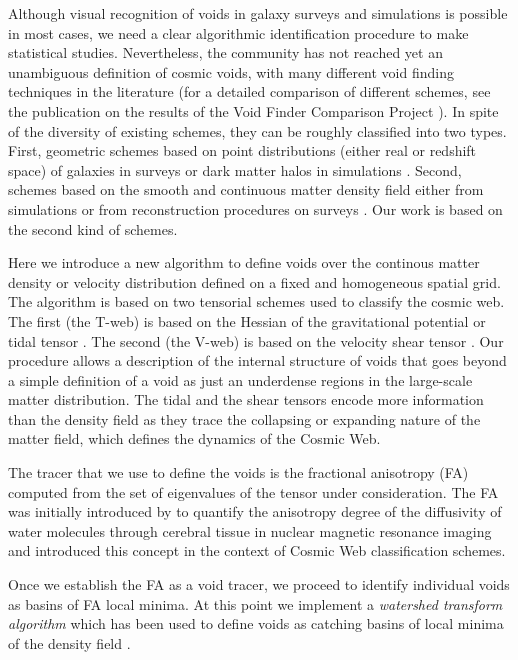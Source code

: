 \documentclass[a4,useAMS,usenatbib,usegraphicx]{latex/mn2e}
\begin{document}
Although visual recognition of voids in galaxy surveys and simulations
is possible in most cases, we need a clear algorithmic identification
procedure to make statistical studies.
Nevertheless, the community has not reached yet an unambiguous
definition of cosmic voids, with many different void finding
techniques in the literature  (for a detailed comparison of different
schemes,  see the publication on the results of the Void Finder
Comparison Project \citet{Colberg08}).  
In spite of the diversity of existing schemes, they can be roughly
classified into two types. First, geometric schemes based on
point distributions (either real or redshift space) of galaxies in
surveys or dark matter halos in  simulations \citep{Kauffmann91, Muller00, 
  Gottlober03, Hoyle04, Brunino07,  Foster09, Micheletti14, Sutter14}.
Second, schemes based on the smooth and continuous matter density
field either from simulations or from reconstruction procedures on
surveys \citep{Plionis02, Colberg05,  Shandarin06, Platen07,
  Neyrinck08, MunozCuartas11, Neyrinck13, Ricciardelli2013}. 
Our work is based on the second kind of schemes. 


Here we introduce a new algorithm to define voids over the continous
matter density or velocity distribution defined on a fixed and
homogeneous spatial grid.
The algorithm is based on two tensorial schemes used to classify the
cosmic web. 
The first (the T-web) is based on the Hessian of the gravitational potential or
tidal tensor \citep{Hahn07, Forero09}. 
The second (the V-web) is based on the velocity shear tensor
\citep{Hoffman12}. 
Our procedure allows a description of the internal structure
of voids that goes beyond a simple definition of a void as just an
underdense regions in the large-scale matter distribution.
The tidal and the shear tensors encode more information than the
density field as they trace the collapsing or expanding
nature of the matter field, which defines the dynamics of the Cosmic
Web. 

The tracer that we use to define the voids is the fractional
anisotropy (FA) computed from the set of eigenvalues of the tensor
under consideration. 
The FA was initially introduced by \citet{Basser95} to quantify the
anisotropy degree of the diffusivity of water molecules through
cerebral tissue in nuclear magnetic resonance
imaging and \citet{Libeskind13} introduced this concept in the context
of Cosmic Web classification schemes. 

Once we establish the FA as a void tracer, we proceed to
identify individual voids as basins of FA local minima. 
At this point we implement a \textit{watershed transform algorithm}
\citep{Beucher79,Beucher93} which has been used to define voids as
catching basins of local minima of the density field
\citep{Platen07,Neyrinck08}.
\end{document}
